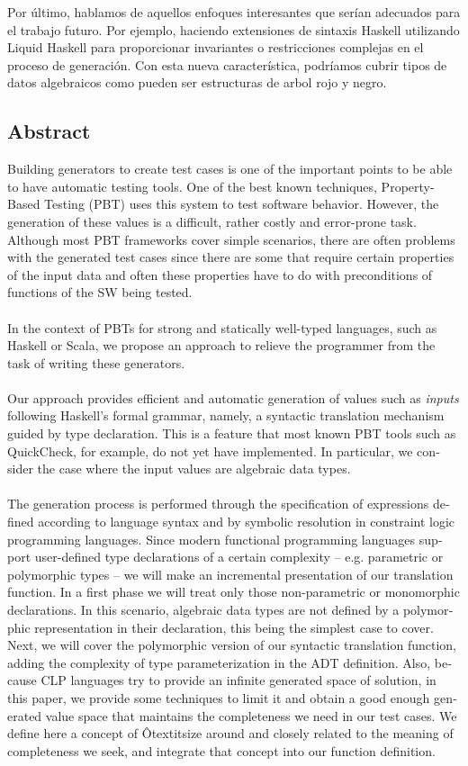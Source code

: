 Por último, hablamos de aquellos enfoques interesantes que serían adecuados para el trabajo futuro. Por ejemplo, haciendo extensiones de sintaxis Haskell utilizando Liquid Haskell para proporcionar invariantes o restricciones complejas en el proceso de generación. Con esta nueva característica, podríamos cubrir tipos de datos algebraicos como pueden ser estructuras de arbol rojo y negro.

\begin{otherlanguage}{english}
	\chapter*{Abstract}
	Building generators to create test cases is one of the important points to be able to have automatic testing tools. One of the best known techniques, Property-Based Testing (PBT) uses this system to test software behavior. However, the generation of these values is a difficult, rather costly and error-prone task. Although most PBT frameworks cover simple scenarios, there are often problems with the generated test cases since there are some that require certain properties of the input data and often these properties have to do with preconditions of functions of the SW being tested.
	\\\\
	In the context of PBTs for strong and statically well-typed languages, such as Haskell or Scala, we propose an approach to relieve the programmer from the task of writing these generators.\\\\
	Our approach provides efficient and automatic generation of values such as \textit{inputs} following Haskell's formal grammar, namely, a syntactic translation mechanism guided by type declaration. This is a feature that most known PBT tools such as QuickCheck, for example, do not yet have implemented. In particular, we consider the case where the input values are algebraic data types.\\\\
	The generation process is performed through the specification of expressions defined according to language syntax and by symbolic resolution in constraint logic programming languages. Since modern functional programming languages support user-defined type declarations of a certain complexity -- e.g. parametric or polymorphic types -- we will make an incremental presentation of our translation function. In a first phase we will treat only those non-parametric or monomorphic declarations. In this scenario, algebraic data types are not defined by a polymorphic representation in their declaration, this being the simplest case to cover. Next, we will cover the polymorphic version of our syntactic translation function, adding the complexity of type parameterization in the ADT definition. Also, because CLP languages try to provide an infinite generated space of solution, in this paper, we provide some techniques to limit it and obtain a good enough generated value space that maintains the completeness we need in our test cases. We define here a concept of Ôtextit{size} around and closely related to the meaning of completeness we seek, and integrate that concept into our function definition.

\end{otherlanguage}
